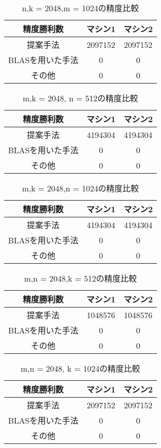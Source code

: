 \documentclass[11pt,a4paper]{jsreport}
\theoremstyle{definition}
\begin{document}
\begin{table}[H]
\centering
\small
\caption{n,k = 2048,m = 1024の精度比較}
\begin{tabular}{c|c|c}
\hline
精度勝利数 & マシン1 & マシン2 \\ \hline \hline
提案手法 & 2097152 & 2097152 \\ \hline
BLASを用いた手法 & 0 & 0 \\ \hline
その他 & 0 & 0 \\ \hline
\end{tabular}
\end{table}

\begin{table}[H]
\centering
\small
\caption{m,k = 2048, n = 512の精度比較}
\begin{tabular}{c|c|c}
\hline
精度勝利数 & マシン1 & マシン2 \\ \hline \hline
提案手法 & 4194304 & 4194304 \\ \hline
BLASを用いた手法 & 0 & 0  \\ \hline
その他 & 0 & 0 \\ \hline
\end{tabular}
\end{table}

\begin{table}[H]
\centering
\small
\caption{m,k = 2048,n = 1024の精度比較}
\begin{tabular}{c|c|c}
\hline
精度勝利数 & マシン1 & マシン2 \\ \hline \hline
提案手法 & 4194304 & 4194304 \\ \hline
BLASを用いた手法 & 0 & 0 \\ \hline
その他 & 0 & 0 \\ \hline
\end{tabular}
\end{table}

\begin{table}[H]
\centering
\small
\caption{m,n = 2048,k = 512の精度比較}
\begin{tabular}{c|c|c}
\hline
精度勝利数 & マシン1 & マシン2 \\ \hline \hline
提案手法 & 1048576 & 1048576 \\ \hline
BLASを用いた手法 & 0 & 0 \\ \hline
その他 & 0 & 0 \\ \hline
\end{tabular}
\end{table}

\begin{table}[H]
\centering
\small
\caption{m,n = 2048, k = 1024の精度比較}
\begin{tabular}{c|c|c}
\hline
精度勝利数 & マシン1 & マシン2 \\ \hline \hline
提案手法 & 2097152 & 2097152 \\ \hline
BLASを用いた手法 & 0 & 0 \\ \hline
その他 & 0 & 0 \\ \hline
\end{tabular}
\end{table}
\end{document}
